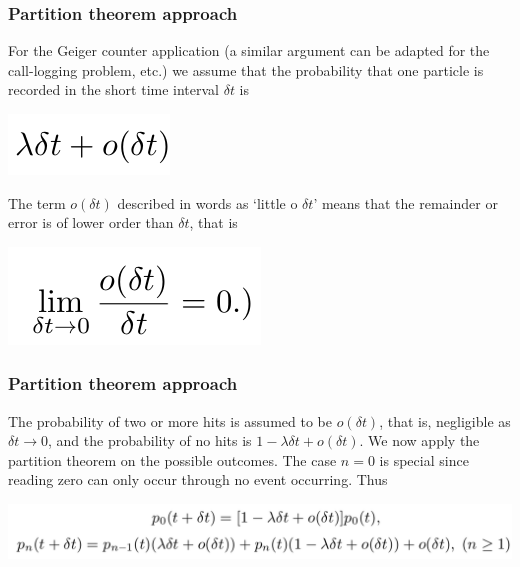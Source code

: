 \documentclass[spanish]{beamer}
\begin{document}
\begin{frame}
\frametitle{Partition theorem approach}
For the Geiger counter application (a similar argument can be adapted for the call-logging problem, etc.) we assume that the probability that one particle is recorded in the short time interval $\delta t$ is

\begin{center}
\includegraphics[scale=0.4]{im16}
\end{center}
The term $o(\delta t)$ described in words as ‘little o $\delta t$’ means that the remainder or error is of lower order than $\delta t$, that is
\begin{center}
\includegraphics[scale=0.4]{im17}
\end{center}

\end{frame}
\begin{frame}
\frametitle{Partition theorem approach}
The probability of two or more hits is assumed to be  $o(\delta t)$, that is, negligible as $\delta t \rightarrow 0$, and the probability of no hits is $1 -\lambda \delta t + o(\delta t)$. We now apply the partition theorem on the possible outcomes. The case $n = 0$ is special since reading zero can only occur through no event occurring. Thus

\begin{center}
\includegraphics[scale=0.3]{im18}
\end{center}

\end{frame}
\end{document}
